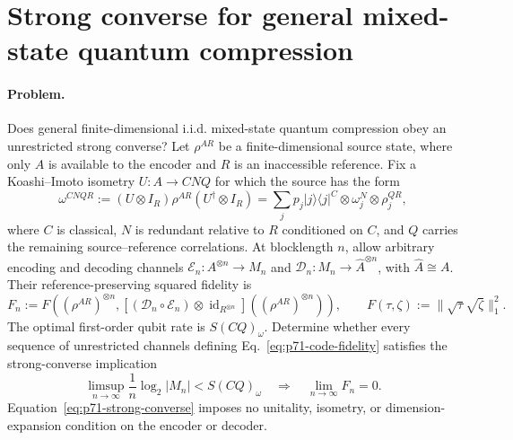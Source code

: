 \section{Strong converse for general mixed-state quantum compression}
\label{sec:op_c9b532d3a7389c77}

\paragraph{Problem.}
Does general finite-dimensional i.i.d. mixed-state quantum compression obey
an unrestricted strong converse?  Let $\rho^{AR}$ be a finite-dimensional
source state, where only $A$ is available to the encoder and $R$ is an
inaccessible reference.  Fix a Koashi--Imoto isometry $U:A\to CNQ$ for which
the source has the form
\begin{equation}
  \omega^{CNQR}
  :=(U\otimes I_R)\rho^{AR}(U^\dagger\otimes I_R)
  =\sum_j p_j|j\rangle\!\langle j|^C
     \otimes\omega_j^N\otimes\rho_j^{QR},
  \label{eq:p71-koashi-imoto}
\end{equation}
where $C$ is classical, $N$ is redundant relative to $R$ conditioned on
$C$, and $Q$ carries the remaining source--reference correlations.  At
blocklength $n$, allow arbitrary encoding and decoding channels
$\mathcal E_n:A^{\otimes n}\to M_n$ and
$\mathcal D_n:M_n\to\widehat A^{\otimes n}$, with
$\widehat A\cong A$.  Their reference-preserving squared fidelity is
\begin{equation}
  F_n:=F\!\left(
    (\rho^{AR})^{\otimes n},
    \left[(\mathcal D_n\circ\mathcal E_n)
      \otimes\operatorname{id}_{R^{\otimes n}}\right]
      ((\rho^{AR})^{\otimes n})
  \right),
  \qquad
  F(\tau,\zeta):=\lVert\sqrt\tau\sqrt\zeta\rVert_1^2.
  \label{eq:p71-code-fidelity}
\end{equation}
The optimal first-order qubit rate is $S(CQ)_\omega$.  Determine whether every
sequence of unrestricted channels defining Eq.~\eqref{eq:p71-code-fidelity}
satisfies the strong-converse implication
\begin{equation}
  \limsup_{n\to\infty}\frac1n\log_2|M_n|<S(CQ)_\omega
  \quad\Longrightarrow\quad
  \lim_{n\to\infty}F_n=0.
  \label{eq:p71-strong-converse}
\end{equation}
Equation~\eqref{eq:p71-strong-converse} imposes no unitality, isometry, or
dimension-expansion condition on the encoder or decoder.

